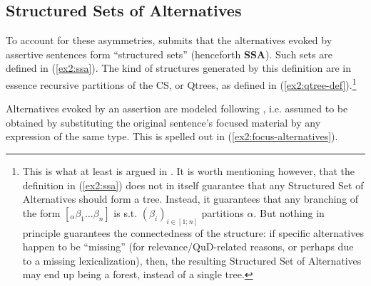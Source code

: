 \subsection{Structured Sets of Alternatives}
To account for these asymmetries, \citet{Ippolito2019} submits that the alternatives evoked by assertive sentences form ``structured sets'' (henceforth \textbf{SSA}). Such sets are defined in (\ref{ex2:ssa}). The kind of structures generated by this definition are in essence recursive partitions of the CS, or Qtrees, as defined in (\ref{ex2:qtree-def}).\footnote{This is what at least is argued in \citet{Ippolito2019}. It is worth mentioning however, that the definition in (\ref{ex2:ssa}) does not in itself guarantee that any Structured Set of Alternatives should form a tree. Instead, it guarantees that any branching of the form $[_{\alpha} \beta_1 ... \beta_n]$ is s.t. $(\beta_i)_{i\in [1; n]}$ partitions $\alpha$. But nothing in principle guarantees the connectedness of the structure: if specific alternatives happen to be ``missing'' (for relevance/QuD-related reasons, or perhaps due to a missing lexicalization), then, the resulting Structured Set of Alternatives may end up being a forest, instead of a single tree.}

\begin{exe}
	\label{ex2:ssa}
\end{exe}

Alternatives evoked by an assertion are modeled following \citet{Rooth1992}, i.e. assumed to be obtained by substituting the original sentence's focused material by any expression of the same type. This is spelled out in (\ref{ex2:focus-alternatives}). 

